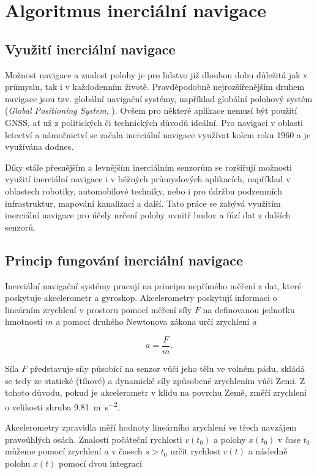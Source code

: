 \chapter{Algoritmus inerciální navigace} \label{INSalg}
\section{Využití inerciální navigace}
Možnost navigace a znalost polohy je pro lidstvo již dlouhou dobu důležitá jak v průmyslu, tak i v každodenním životě. Pravděpodobně nejrozšířenějším druhem navigace jsou tzv. globální navigační systémy, například globální polohový systém (\emph{Global Positioning System}, ). Ovšem pro některé aplikace nemusí být použití \ac{GNSS}, ať už z politických či technických důvodů ideální. Pro navigaci v oblasti letectví a námořnictví se začala inerciální navigace využívat kolem roku 1960 a je využívána dodnes. \cite{Tittertonc2004}

Díky stále přesnějším a levnějším inerciálním senzorům se rozšiřují možnosti využití inerciální navigace i v běžných průmyslových aplikacích, například v oblastech robotiky, automobilové techniky, nebo i pro údržbu podzemních infrastruktur, mapování kanalizací a další. \cite{Tittertonc2004} Tato práce se zabývá využitím inerciální navigace pro účely určení polohy uvnitř budov a fúzí dat z dalších senzorů.

\section{Princip fungování inerciální navigace} \label{INSPrinciple}
Inerciální navigační systémy pracují na principu nepřímého měření z dat, které poskytuje akcelerometr a gyroskop.   
Akcelerometry poskytují informaci o lineárním zrychlení v prostoru pomocí měření síly $ F $ na definovanou jednotku hmotnosti $ m $ a pomocí druhého Newtonova zákona určí zrychlení $ a $ \cite{Tittertonc2004}

\begin{equation} \label{eq:2NZ}
a=\frac{F}{m} .
\end{equation}

Síla $ F $ představuje síly působící na senzor vůči jeho tělu ve volném pádu, skládá se tedy ze statické (tíhové) a dynamické síly způsobené zrychlením vůči Zemi. \cite{Tittertonc2004}
Z tohoto důvodu, pokud je akcelerometr v klidu na povrchu Země, změří zrychlení o velikosti zhruba \SI{9,81}{\meter\per\second\squared}.

Akcelerometry zpravidla měří hodnoty lineárního zrychlení ve třech navzájem pravoúhlých osách. Znalostí počáteční rychlosti $ v(t_{0}) $ a polohy $ x(t_{0}) $ v čase $ t_{0} $ můžeme pomocí zrychlení $ a $ v časech $ s>t_{0} $ určit rychlost $ v(t) $ a následně polohu $ x(t) $ pomocí dvou integrací \cite{Grewal2013}

